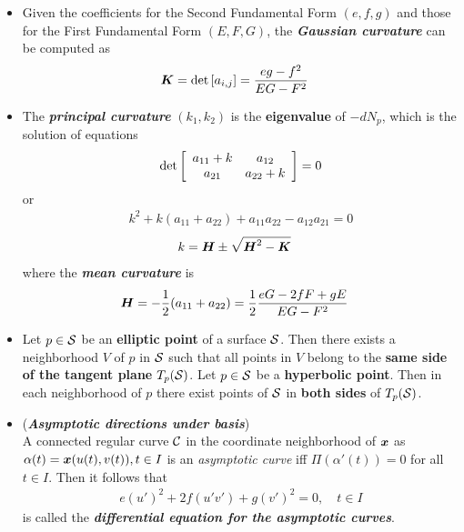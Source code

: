 \documentclass[11pt]{article}
\begin{document}
\begin{itemize}
\item Given the coefficients for the Second Fundamental Form $(e,f,g)$ and those for the First Fundamental Form $(E,F,G)$, the \emph{\textbf{Gaussian curvature}} can be computed as 
\begin{align}
\boldsymbol{K} &= \det\left[a_{i,j}\right] = \frac{eg- f^{2}}{EG- F^{2}} \label{eqn: Gaussian_curvature}
\end{align}



\item  The \emph{\textbf{principal curvature}} $(k_{1}, k_{2})$ is the \textbf{eigenvalue} of $-dN_{p}$, which is the solution of equations
\begin{align*}
\det\left[\begin{array}{cc}
a_{11}+ k & a_{12} \\ 
a_{21} & a_{22}+k
\end{array} \right] = 0
\end{align*} or
\begin{align*}
k^{2}+ k(a_{11}+ a_{22}) + a_{11}a_{22} - a_{12}a_{21} = 0
\end{align*}
\begin{align}
k &= \boldsymbol{H} \pm \sqrt{\boldsymbol{H}^{2}- \boldsymbol{K}}  \label{eqn: principal_curv_coord}
\end{align}
where the \emph{\textbf{mean curvature}} is 
\begin{align}
\boldsymbol{H} &= -\frac{1}{2}(a_{11}+ a_{22}) = \frac{1}{2}\frac{eG - 2fF + gE}{EG-F^{2}}
\end{align}


\item \begin{proposition}
Let $p \in {\mathcal S}$ be an \textbf{elliptic point} of a surface ${\mathcal S}$. Then there exists a neighborhood $V$ of $p$ in ${\mathcal S}$ such that all points in $V$ belong to the \textbf{same side of the tangent plane} $T_{p}({\mathcal S})$. Let $p \in {\mathcal S}$ be a \textbf{hyperbolic point}. Then in each neighborhood of $p$ there exist points of ${\mathcal S}$ in \textbf{both sides} of $T_{p}({\mathcal S})$.
\end{proposition}



\item (\emph{\textbf{Asymptotic directions under basis}})\\
A connected regular curve ${\mathcal C}$ in the coordinate neighborhood of $\boldsymbol{x}$ as $\alpha(t) = \boldsymbol{x}(u(t), v(t)), t\in I$ is an \emph{asymptotic curve} iff $\Pi(\alpha'(t)) = 0$ for all $t\in I$. Then it follows that
\begin{align}
e(u')^{2} + 2f(u'v') + g(v')^{2} = 0,\quad t\in I \label{eqn: diff_eqn_asym_curve}
\end{align}
is called the \emph{\textbf{differential equation for the asymptotic curves}}. 


\end{itemize}
\end{document}
